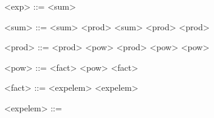 \begin{grammarEx}
	<exp> ::= <sum>
		
	<sum> ::= <sum> \lit{\opplus{}} <prod>
	\alt <sum> \lit{\opminus{}} <prod>
	\alt <prod>

	<prod> ::= <prod> \lit{\opmult{}} <pow>
	\alt <prod> \lit{/} <pow>
	\alt <pow>

	<pow> ::= <fact> \lit{\oppow{}} <pow>
	\alt <fact>

	<fact> ::= <exp\textunderscore elem> \lit{\opfact{}}
	\alt <exp\textunderscore elem>

	<exp\textunderscore elem> ::= 
	\alt {}
\end{grammarEx}